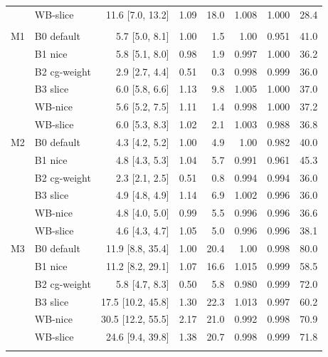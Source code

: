 \begin{table}[t]
\begin{tabular}{llrrrrrr}
 & WB-slice & 11.6 {\scriptsize[7.0, 13.2]} & 1.09 & 18.0 & 1.008 & 1.000 & 28.4 \\
\addlinespace[2pt]
\multicolumn{8}{l}{\textit{Contention x4 (4 batch threads per core)}} \\
M1 & B0 default & 5.7 {\scriptsize[5.0, 8.1]} & 1.00 & 1.5 & 1.00 & 0.951 & 41.0 \\
 & B1 nice & 5.8 {\scriptsize[5.1, 8.0]} & 0.98 & 1.9 & 0.997 & 1.000 & 36.2 \\
 & B2 cg-weight & 2.9 {\scriptsize[2.7, 4.4]} & 0.51 & 0.3 & 0.998 & 0.999 & 36.0 \\
 & B3 slice & 6.0 {\scriptsize[5.8, 6.6]} & 1.13 & 9.8 & 1.005 & 1.000 & 37.0 \\
 & WB-nice & 5.6 {\scriptsize[5.2, 7.5]} & 1.11 & 1.4 & 0.998 & 1.000 & 37.2 \\
 & WB-slice & 6.0 {\scriptsize[5.3, 8.3]} & 1.02 & 2.1 & 1.003 & 0.988 & 36.8 \\
\addlinespace[2pt]
M2 & B0 default & 4.3 {\scriptsize[4.2, 5.2]} & 1.00 & 4.9 & 1.00 & 0.982 & 40.0 \\
 & B1 nice & 4.8 {\scriptsize[4.3, 5.3]} & 1.04 & 5.7 & 0.991 & 0.961 & 45.3 \\
 & B2 cg-weight & 2.3 {\scriptsize[2.1, 2.5]} & 0.51 & 0.8 & 0.994 & 0.994 & 36.0 \\
 & B3 slice & 4.9 {\scriptsize[4.8, 4.9]} & 1.14 & 6.9 & 1.002 & 0.996 & 36.0 \\
 & WB-nice & 4.8 {\scriptsize[4.0, 5.0]} & 0.99 & 5.5 & 0.996 & 0.996 & 36.6 \\
 & WB-slice & 4.6 {\scriptsize[4.3, 4.7]} & 1.05 & 5.0 & 0.996 & 0.996 & 38.1 \\
\addlinespace[2pt]
M3 & B0 default & 11.9 {\scriptsize[8.8, 35.4]} & 1.00 & 20.4 & 1.00 & 0.998 & 80.0 \\
 & B1 nice & 11.2 {\scriptsize[8.2, 29.1]} & 1.07 & 16.6 & 1.015 & 0.999 & 58.5 \\
 & B2 cg-weight & 5.8 {\scriptsize[4.7, 8.3]} & 0.50 & 5.8 & 0.980 & 0.999 & 72.0 \\
 & B3 slice & 17.5 {\scriptsize[10.2, 45.8]} & 1.30 & 22.3 & 1.013 & 0.997 & 60.2 \\
 & WB-nice & 30.5 {\scriptsize[12.2, 55.5]} & 2.17 & 21.0 & 0.992 & 0.998 & 70.9 \\
 & WB-slice & 24.6 {\scriptsize[9.4, 39.8]} & 1.38 & 20.7 & 0.998 & 0.999 & 71.8 \\
\addlinespace[2pt]
\bottomrule
\end{tabular}
\end{table}
